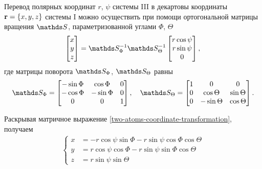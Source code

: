 Перевод полярных координат $r$, $\psi$ системы III в декартовы координаты $\mathbf{r} = \left\{ x, y, z \right\}$ системы I можно осуществить при помощи ортогональной матрицы вращения $\bbS$, параметризованной углами $\Phi$, $\Theta$ \cite{goldstein} 
\begin{gather}
    \begin{bmatrix}
        x \\ y \\ z
    \end{bmatrix} 
    = \bbS_\Phi^{-1} \bbS_\Theta^{-1} 
    \begin{bmatrix}
        r \cos \psi \\ r \sin \psi \\ 0
    \end{bmatrix}, \label{two-atoms-coordinate-transformation}
\end{gather}
% 
где матрицы поворота $\bbS_\Phi$, $\bbS_\Theta$ равны
\begin{gather}
    \bbS_\Phi = 
    \begin{bmatrix}
       -\sin \Phi & \cos \Phi & 0 \\
       -\cos \Phi & -\sin \Phi & 0 \\
      0 & 0 & 1
    \end{bmatrix}, \quad
    \bbS_\Theta = 
    \begin{bmatrix}
        1 & 0 & 0 \\
        0 & \cos \Theta & \sin \Theta \\
        0 & -\sin \Theta & \cos \Theta
    \end{bmatrix}.
\end{gather}

Раскрывая матричное выражение \eqref{two-atoms-coordinate-transformation}, получаем 
\begin{gather}
    \left\{
        \begin{aligned}
            x &= -r \cos \psi \sin \Phi - r \sin \psi \cos \Phi \cos \Theta \\
            y &= r \cos \psi \cos \Phi - r \sin \psi \sin \Phi \cos \Theta \\
            z &= r \sin \psi \sin \Theta
        \end{aligned}
    \right. \label{two-atoms-coordinates-transformation2}
\end{gather}

